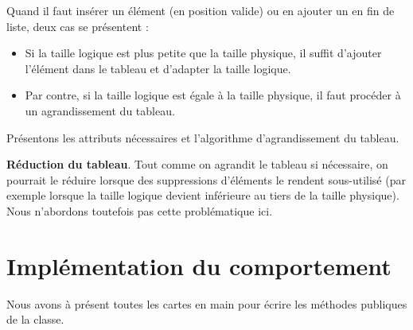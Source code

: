 Quand il faut insérer un élément (en position valide) ou en ajouter un
en fin de liste, deux cas se présentent :

\liststyleListv
\begin{itemize}
	\item 
		Si la taille logique est plus petite que la taille physique, il suffit
		d’ajouter l’élément dans le tableau et d’adapter la taille logique.
	\item 
		Par contre, si la taille logique est égale à la taille physique, il faut
		procéder à un agrandissement du tableau.
\end{itemize}

Présentons les attributs nécessaires et l'algorithme
d’agrandissement du tableau.


\bigskip

\textbf{Réduction du tableau}. Tout comme on agrandit le tableau si
nécessaire, on pourrait le réduire lorsque des suppressions d’éléments
le rendent sous-utilisé (par exemple lorsque la taille logique devient
inférieure au tiers de la taille physique). Nous n’abordons toutefois
pas cette problématique ici.


\section{Implémentation du comportement}

Nous avons à présent toutes les cartes en main pour écrire les méthodes
publiques de la classe.


